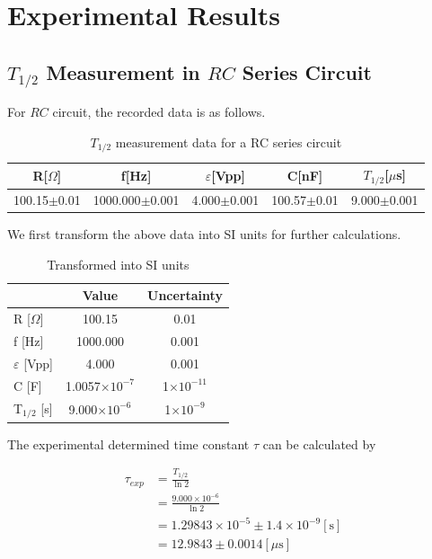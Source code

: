 \documentclass[a4paper]{article}
\begin{document}
\section{Experimental Results}

\subsection{$T_{1/2}$ Measurement in $RC$ Series Circuit}

For $RC$ circuit, the recorded data is as follows.
\begin{table}[!htbp]
	\centering
	\begin{tabular}{ccccc}
		\hline
		R[$\Omega$]     & f[Hz]              & $\varepsilon$[Vpp] & C[nF]           & $T_{1/2}$[$\mu$s] \\
		\hline
		100.15$\pm$0.01 & 1000.000$\pm$0.001 & 4.000$\pm$0.001    & 100.57$\pm$0.01 & 9.000$\pm$0.001   \\
		\hline
	\end{tabular}%
	\caption{$T_{1/2}$ measurement data for a RC series circuit}
\end{table}

We first transform the above data into SI units for further calculations.
\begin{table}[!htbp]
	\centering
	\begin{tabular}{l c c}
		\hline
		                    & Value                  & Uncertainty        \\
		\hline
		R [$\Omega$]        & 100.15                 & 0.01               \\
		f [Hz]              & 1000.000               & 0.001              \\
		$\varepsilon$ [Vpp] & 4.000                  & 0.001              \\
		C [F]               & 1.0057$\times 10^{-7}$ & 1$\times 10^{-11}$ \\
		T$_{1/2}$ [s]       & 9.000$\times 10^{-6}$  & 1$\times 10^{-9}$  \\
		\hline
	\end{tabular}
	\caption{Transformed into SI units}
\end{table}

The experimental determined time constant $\tau$ can be calculated by


\begin{align*}
	\tau_{exp}
	 & =\frac{T_{1/2}}{\ln2}                                 \\
	 & =\frac{9.000\times 10^{-6}}{\ln2}                     \\
	 & =1.29843\times 10^{-5}\pm 1.4\times 10^{-9}[\text{s}] \\
	 & =12.9843\pm 0.0014[\mu \text{s}]
\end{align*}
\end{document}
